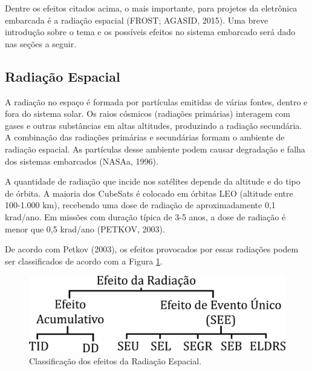 Dentre os efeitos citados acima, o mais importante, para projetos da eletrônica embarcada é a radiação espacial (FROST; AGASID, 2015). Uma breve introdução sobre o tema e os possíveis efeitos no sistema embarcado será dado nas seções a seguir.

\subsection{Radiação Espacial}

A radiação no espaço é formada por partículas emitidas de várias fontes, dentro e fora do sistema solar. Os raios cósmicos (radiações primárias) interagem com gases e outras substâncias em altas altitudes, produzindo a radiação secundária. A combinação das radiações primárias e secundárias formam o ambiente de radiação espacial. As partículas desse ambiente podem causar degradação e falha dos sistemas embarcados (NASAa, 1996).

A quantidade de radiação que incide nos satélites depende da altitude e do tipo de órbita. A maioria dos CubeSats é colocado em órbitas LEO (altitude entre 100-1.000 km), recebendo uma dose de radiação de aproximadamente 0,1 krad/ano. Em missões com duração típica de 3-5 anos, a dose de radiação é menor que 0,5 krad/ano  (PETKOV, 2003).

De acordo com Petkov (2003), os efeitos provocados por essas radiações podem ser classificados de acordo com a Figura \ref{fig17}.

\begin{figure}[h]
	\centering
	
	\caption{Classificação dos efeitos da Radiação Espacial.}
	
	\includegraphics[keepaspectratio=true,scale=0.55]{figuras/radiation.jpg}
	
	\label{fig17}
\end{figure}

